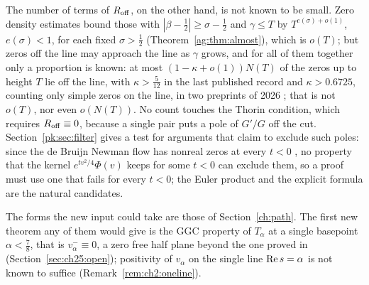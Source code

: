 The number of terms of $R_{\rm off}$, on the other hand, is not known to be small. Zero density estimates bound those with $|\beta-\frac12|\ge\sigma-\frac12$ and $\gamma\le T$ by $T^{e(\sigma)+o(1)}$, $e(\sigma)<1$, for each fixed $\sigma>\frac12$ (Theorem~\ref{ag:thm:almost}), which is $o(T)$; but zeros off the line may approach the line as $\gamma$ grows, and for all of them together only a proportion is known: at most $(1-\kappa+o(1))N(T)$ of the zeros up to height $T$ lie off the line, with $\kappa>\frac5{12}$ in the last published record \cite{PRZZ20} and $\kappa>0.6725$, counting only simple zeros on the line, in two preprints of 2026 \cite{AF26,Lam26}; that is not $o(T)$, nor even $o(N(T))$. No count touches the Thorin condition, which requires $R_{\rm off}\equiv0$, because a single pair puts a pole of $G'/G$ off the cut. Section~\ref{pk:sec:filter} gives a test for arguments that claim to exclude such poles: since the de Bruijn Newman flow has nonreal zeros at every $t<0$ \cite{RodgersTao}, no property that the kernel $e^{tv^2/4}\Phi(v)$ keeps for some $t<0$ can exclude them, so a proof must use one that fails for every $t<0$; the Euler product and the explicit formula are the natural candidates.

The forms the new input could take are those of Section~\ref{ch:path}. The first new theorem any of them would give is the GGC property of $T_\alpha$ at a single basepoint $\alpha<\frac78$, that is $v_\alpha^-\equiv0$, a zero free half plane beyond the one proved in \cite{OAI26a} (Section~\ref{sec:ch25:open}); positivity of $v_\alpha$ on the single line $\operatorname{Re} s=\alpha$ is not known to suffice (Remark~\ref{rem:ch2:oneline}).

